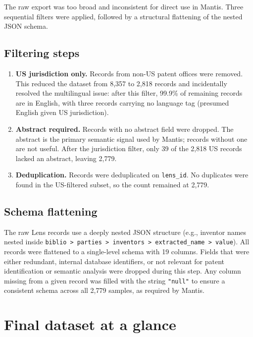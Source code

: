 \documentclass[11pt]{article}
\begin{document}
The raw export was too broad and inconsistent for direct use in Mantis. Three sequential
filters were applied, followed by a structural flattening of the nested JSON schema.

\subsection{Filtering steps}

\begin{enumerate}
  \item \textbf{US jurisdiction only.} Records from non-US patent offices were removed.
    This reduced the dataset from 8,357 to 2,818 records and incidentally resolved the
    multilingual issue: after this filter, 99.9\% of remaining records are in English, with
    three records carrying no language tag (presumed English given US jurisdiction).

  \item \textbf{Abstract required.} Records with no abstract field were dropped. The
    abstract is the primary semantic signal used by Mantis; records without one are not
    useful. After the jurisdiction filter, only 39 of the 2,818 US records lacked an
    abstract, leaving 2,779.

  \item \textbf{Deduplication.} Records were deduplicated on \texttt{lens\_id}. No
    duplicates were found in the US-filtered subset, so the count remained at 2,779.
\end{enumerate}

\subsection{Schema flattening}

The raw Lens records use a deeply nested JSON structure (e.g., inventor names nested inside
\texttt{biblio\,>\,parties\,>\,inventors\,>\,extracted\_name\,>\,value}). All records were
flattened to a single-level schema with 19 columns. Fields that were either redundant,
internal database identifiers, or not relevant for patent identification or semantic analysis
were dropped during this step. Any column missing from a given record was filled with the
string \texttt{"null"} to ensure a consistent schema across all 2,779 samples, as required
by Mantis.

\section{Final dataset at a glance}
\label{sec:final}
\end{document}
